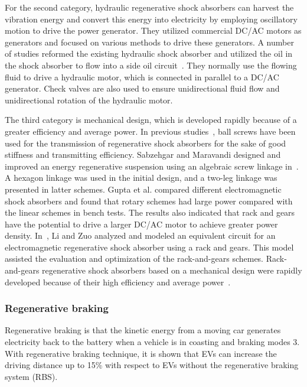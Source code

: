For the second category, hydraulic regenerative shock absorbers can harvest the vibration energy and convert this energy into electricity by employing oscillatory motion to drive the power generator. They utilized commercial DC/AC motors as generators and focused on various methods to drive these generators. A number of studies reformed the existing hydraulic shock absorber and utilized the oil in the shock absorber to flow into a side oil circuit~\cite{JX_19,JX_20,JX_74}. They normally use the flowing fluid to drive a hydraulic motor, which is connected in parallel to a DC/AC generator. Check valves are also used to ensure unidirectional fluid flow and unidirectional rotation of the hydraulic motor.

The third category is mechanical design, which is developed rapidly because of a greater efficiency and average power. In previous studies~\cite{JX_3,JX_24,JX_49,JX_59}, ball screws have been used for the transmission of regenerative shock absorbers for the sake of good stiffness and transmitting efficiency. Sabzehgar and Maravandi designed and improved an energy regenerative suspension using an algebraic screw linkage in~\cite{JX_49,JX_59}. A hexagon linkage was used in the initial design, and a two-leg linkage was presented in latter schemes. Gupta et al. \cite{JX_22} compared different electromagnetic shock absorbers and found that rotary schemes had large power compared with the linear schemes in bench tests. The results also indicated that rack and gears have the potential to drive a larger DC/AC motor to achieve greater power density. In~\cite{JX_38}, Li and Zuo analyzed and modeled an equivalent circuit for an electromagnetic regenerative shock absorber using a rack and gears. This model assisted the evaluation and optimization of the rack-and-gears schemes. Rack-and-gears regenerative shock absorbers based on a mechanical design were rapidly developed because of their high efficiency and average power~\cite{JX_39,JX_40}.

\subsubsection{Regenerative braking}

Regenerative braking is that the kinetic energy from a moving car generates electricity back to the battery when a vehicle is in coasting and braking modes 3. With regenerative braking technique, it is shown that EVs can increase the driving distance up to 15\% with respect to EVs without the regenerative braking system (RBS).

